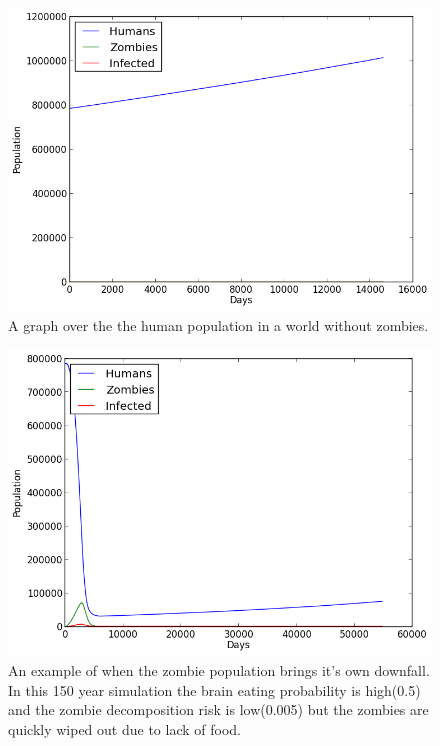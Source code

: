 \documentclass{report}
\begin{document}
\begin{figure}
\includegraphics[width=350pt]{plots/withoutzombies}
\caption{A graph over the the human population in a world without zombies.}
\label{withoutzombies}
\end{figure}
\begin{figure}
\includegraphics[width=350pt]{plots/zombieswipedout}
\caption{An example of when the zombie population brings it's own downfall. In this 150 year simulation the brain eating probability is high(0.5) and the zombie decomposition risk is low(0.005) but the zombies are quickly wiped out due to lack of food.}
\label{zombieswipedout}
\end{figure}
\end{document}
